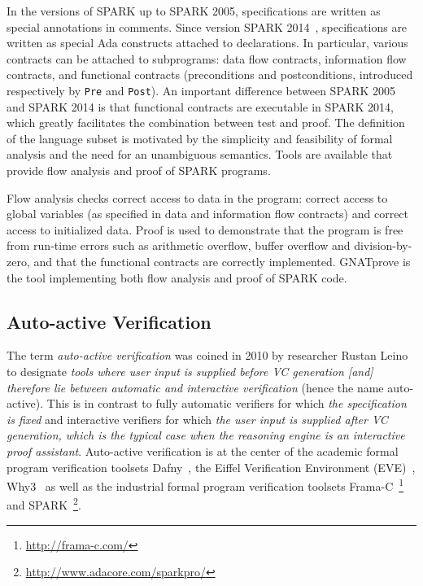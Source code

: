 \documentclass{llncs}
\newcommand{\gnatprove}{GNATprove\xspace}
\newcommand{\spark}{SPARK\xspace}
\begin{document}
In the versions of \spark up to \spark 2005, specifications are written as
special annotations in comments. Since version \spark 2014~\cite{mccormick15},
specifications are written as special Ada constructs attached to
declarations. In particular, various contracts can be attached to subprograms:
data flow contracts, information flow contracts, and functional contracts
(preconditions and postconditions, introduced respectively by \texttt{Pre} and
\texttt{Post}). An important difference between \spark 2005 and \spark 2014 is
that functional contracts are executable in \spark 2014, which greatly
facilitates the combination between test and proof. The definition of the
language subset is motivated by the simplicity and feasibility of formal
analysis and the need for an unambiguous semantics. Tools are available that
provide flow analysis and proof of \spark programs.

Flow analysis checks correct access to data in the program: correct access to
global variables (as specified in data and information flow contracts) and
correct access to initialized data. Proof is used to demonstrate that the
program is free from run-time errors such as arithmetic overflow, buffer
overflow and division-by-zero, and that the functional contracts are correctly
implemented. \gnatprove is the tool implementing both flow analysis and proof
of SPARK code.

\subsection{Auto-active Verification}
\label{sec-prelim-auto-active}

The term \emph{auto-active verification} was coined in 2010 by researcher
Rustan Leino~\cite{Leino10usableauto-active} to designate \textit{tools where
  user input is supplied before VC generation [and] therefore lie between
  automatic and interactive verification} (hence the name auto-active). This is
in contrast to fully automatic verifiers for which \textit{the specification is
  fixed} and interactive verifiers for which \textit{the user input is supplied
  after VC generation, which is the typical case when the reasoning engine is
  an interactive proof assistant}. Auto-active verification is at the center of
the academic formal program verification toolsets Dafny~\cite{Leino2010Dafny},
the Eiffel Verification Environment (EVE)~\cite{Furia2016},
Why3~\cite{filliatre2013Why3} as well as the industrial formal program
verification toolsets Frama-C~\footnote{\url{http://frama-c.com/}} and
\spark~\footnote{\url{http://www.adacore.com/sparkpro/}}.
\end{document}
